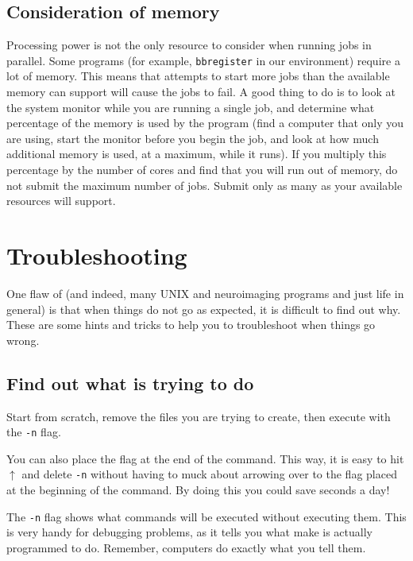 \subsection{Consideration of memory}

Processing power is not the only resource to consider when running jobs in parallel. Some programs (for example, \texttt{bbregister} in our environment) require a lot of memory. This means that attempts to start more jobs than the available memory can support will cause the jobs to fail. A good thing to do is to look at the system monitor while you are running a single job, and determine what percentage of the memory is used by the program (find a computer that only you are using, start the monitor before you begin the job, and look at how much additional memory is used, at a maximum, while it runs). If you multiply this percentage by the number of cores and find that you will run out of memory, do not submit the maximum number of jobs. Submit only as many as your available resources will support.

\section{Troubleshooting \maken}

One flaw of \maken{} (and indeed, many UNIX and neuroimaging programs and just life in general) is that when things do not go as expected, it is difficult to find out why. These are some hints and tricks to help you to troubleshoot when things go wrong.

\subsection{Find out what \maken{} is trying to do}

Start from scratch, remove the files you are trying to create, then execute \maken{} with the \texttt{-n} flag.

You can also place the flag at the end of the command. This way, it is easy to hit $\uparrow$ and delete \texttt{-n} without having to muck about arrowing over to the flag placed at the beginning of the command. By doing this you could save seconds a day!

The \texttt{-n} flag shows what commands will be executed without executing them. This is very handy for debugging problems, as it tells you what make is actually programmed to do. Remember, computers do exactly what you tell them.

